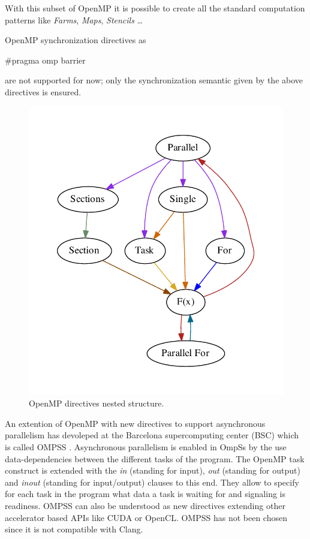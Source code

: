 \documentclass[a4paper,12pt,oneside]{book}
\begin{document}
With this subset of OpenMP it is possible to create all the standard computation patterns like \emph{Farms}, \emph{Maps}, \emph{Stencils} \dots 

OpenMP synchronization directives as \begin{bf}$\#$pragma omp barrier\end{bf} are not supported for now; only the synchronization semantic given by the above directives is ensured. 

\begin{figure}[H]
\centering
\includegraphics[scale=0.8]{omp.pdf}
\caption{OpenMP directives nested structure.}
\end{figure}

An extention of OpenMP with new directives to support asynchronous parallelism has devoleped at the Barcelona supercomputing center (BSC) which is called OMPSS \cite{ompss}. Asynchronous parallelism is enabled in OmpSs by the use data-dependencies between the different tasks of the program. The OpenMP task construct is extended with the \emph{in} (standing for input), \emph{out} (standing for output) and \emph{inout} (standing for input/output) clauses to this end. They allow to specify for each task in the program what data a task is waiting for and signaling is readiness. OMPSS can also be understood as new directives extending other accelerator based APIs like CUDA or OpenCL. OMPSS has not been chosen since it is not compatible with Clang.
\end{document}
